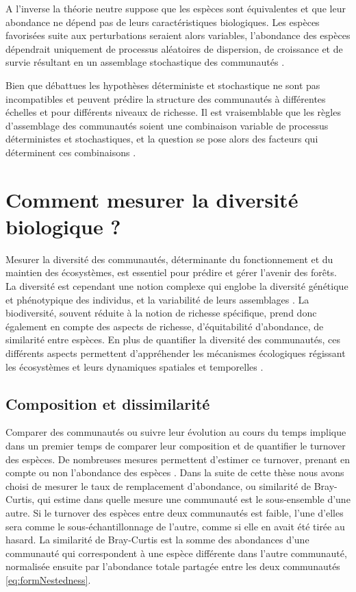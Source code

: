 \documentclass[
  11pt,
  french,
  A4paper,
  extrafontsizes,onecolumn,openright
  ]{memoir}
\begin{document}
A l'inverse la théorie neutre suppose que les espèces sont équivalentes
et que leur abondance ne dépend pas de leurs caractéristiques
biologiques. Les espèces favorisées suite aux perturbations seraient
alors variables, l'abondance des espèces dépendrait uniquement de
processus aléatoires de dispersion, de croissance et de survie résultant
en un assemblage stochastique des communautés \autocite{Hubbell2001}.

Bien que débattues les hypothèses déterministe et stochastique ne sont
pas incompatibles et peuvent prédire la structure des communautés à
différentes échelles et pour différents niveaux de richesse. Il est
vraisemblable que les règles d'assemblage des communautés soient une
combinaison variable de processus déterministes et stochastiques, et la
question se pose alors des facteurs qui déterminent ces combinaisons
\autocite{Chave2004}.

\section{Comment mesurer la diversité biologique
?}\label{comment-mesurer-la-diversite-biologique}

Mesurer la diversité des communautés, déterminante du fonctionnement et
du maintien des écosystèmes, est essentiel pour prédire et gérer
l'avenir des forêts. La diversité est cependant une notion complexe qui
englobe la diversité génétique et phénotypique des individus, et la
variabilité de leurs assemblages \autocite{Loreau2005}. La biodiversité,
souvent réduite à la notion de richesse spécifique, prend donc également
en compte des aspects de richesse, d'équitabilité d'abondance, de
similarité entre espèces. En plus de quantifier la diversité des
communautés, ces différents aspects permettent d'appréhender les
mécanismes écologiques régissant les écosystèmes et leurs dynamiques
spatiales et temporelles \autocites{Purvis2000}{Loreau2005}.

\subsection{Composition et
dissimilarité}\label{composition-et-dissimilarite}

Comparer des communautés ou suivre leur évolution au cours du temps
implique dans un premier temps de comparer leur composition et de
quantifier le turnover des espèces. De nombreuses mesures permettent
d'estimer ce turnover, prenant en compte ou non l'abondance des espèces
\autocite{Podani2013}. Dans la suite de cette thèse nous avons choisi de
mesurer le taux de remplacement d'abondance, ou similarité de
Bray-Curtis, qui estime dans quelle mesure une communauté est le
sous-ensemble d'une autre. Si le turnover des espèces entre deux
communautés est faible, l'une d'elles sera comme le sous-échantillonnage
de l'autre, comme si elle en avait été tirée au hasard. La similarité de
Bray-Curtis est la somme des abondances d'une communauté qui
correspondent à une espèce différente dans l'autre communauté,
normalisée ensuite par l'abondance totale partagée entre les deux
communautés \eqref{eq:formNestedness}.
\end{document}
